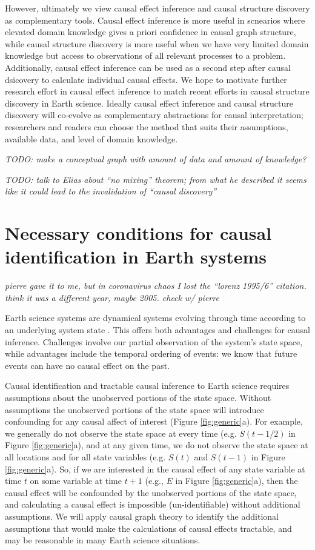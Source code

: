 \documentclass[12pt]{article}
\begin{document}
However, ultimately we view causal effect inference and causal
structure discovery as complementary tools. Causal effect inference is
more useful in scnearios where elevated domain knowledge gives a
priori confidence in causal graph structure, while causal structure
discovery is more useful when we have very limited domain knowledge
but access to observations of all relevant processes to a
problem. Additionally, causal effect inference can be used as a second
step after causal dsicovery to calculate individual causal effects. We
hope to motivate further research effort in causal effect inference to
match recent efforts in causal structure discovery in Earth
science. Ideally causal effect inference and causal structure
discovery will co-evolve as complementary abstractions for causal
interpretation; researchers and readers can choose the method that
suits their assumptions, available data, and level of domain
knowledge.

\textit{TODO: make a conceptual graph with amount of data and amount
  of knowledge?}

\textit{ TODO: talk to Elias about ``no mixing'' theorem; from what he
  described it seems like it could lead to the invalidation of
  ``causal discovery''}

\section{Necessary conditions for causal identification in Earth
  systems}
\label{sec:necess-cond-caus}

\textit{pierre gave it to me, but in coronavirus chaos I lost the
  ``lorenz 1995/6'' citation. think it was a different year, maybe
  2005. check w/ pierre}

Earth science systems are dynamical systems evolving through time
according to an underlying system state
\citep{lorenz-1963,majda-state}. This offers both advantages and
challenges for causal inference. Challenges involve our partial
observation of the system's state space, while advantages include the
temporal ordering of events: we know that future events can have no
causal effect on the past.

Causal identification and tractable causal inference to Earth science
requires assumptions about the unobserved portions of the state
space. Without assumptions the unobserved portions of the state space
will introduce confounding for any causal affect of interest (Figure
\ref{fig:generic}a). For example, we generally do not observe the state
space at every time (e.g. $S(t-1/2)$ in Figure \ref{fig:generic}a), and
at any given time, we do not observe the state space at all locations
and for all state variables (e.g. $S(t)$ and $S(t-1)$ in Figure
\ref{fig:generic}a). So, if we are interested in the causal effect of
any state variable at time $t$ on some variable at time $t+1$ (e.g.,
$E$ in Figure \ref{fig:generic}a), then the causal effect will be
confounded by the unobserved portions of the state space, and
calculating a causal effect is impossible (un-identifiable) without
additional assumptions. We will apply causal graph theory to identify
the additional assumptions that would make the calculations of causal
effects tractable, and may be reasonable in many Earth science
situations.
\end{document}
